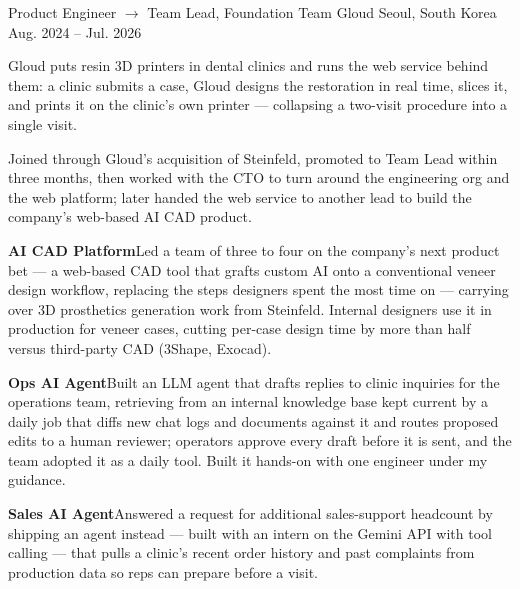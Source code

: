 

\begin{cventries}

  \cventry
    {Product Engineer $\rightarrow$ Team Lead, Foundation Team} %
    {Gloud} %
    {Seoul, South Korea} %
    {Aug. 2024 -- Jul. 2026} %
    {
      \begin{cvitems}
        \item {Gloud puts resin 3D printers in dental clinics and runs the web service behind them: a clinic submits a case, Gloud designs the restoration in real time, slices it, and prints it on the clinic’s own printer — collapsing a two-visit procedure into a single visit.}
        \item {Joined through Gloud’s acquisition of Steinfeld, promoted to Team Lead within three months, then worked with the CTO to turn around the engineering org and the web platform; later handed the web service to another lead to build the company’s web-based AI CAD product.}
        \item {\textbf{AI CAD Platform}\enspace Led a team of three to four on the company’s next product bet — a web-based CAD tool that grafts custom AI onto a conventional veneer design workflow, replacing the steps designers spent the most time on — carrying over 3D prosthetics generation work from Steinfeld. Internal designers use it in production for veneer cases, cutting per-case design time by more than half versus third-party CAD (3Shape, Exocad).}
        \item {\textbf{Ops AI Agent}\enspace Built an LLM agent that drafts replies to clinic inquiries for the operations team, retrieving from an internal knowledge base kept current by a daily job that diffs new chat logs and documents against it and routes proposed edits to a human reviewer; operators approve every draft before it is sent, and the team adopted it as a daily tool. Built it hands-on with one engineer under my guidance.}
        \item {\textbf{Sales AI Agent}\enspace Answered a request for additional sales-support headcount by shipping an agent instead — built with an intern on the Gemini API with tool calling — that pulls a clinic’s recent order history and past complaints from production data so reps can prepare before a visit.}

\end{cvitems}}
\end{cventries}
